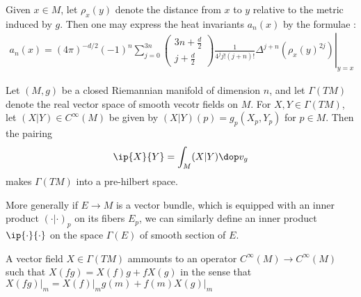 Given $x\in M$, let $\rho_x(y)$ denote the distance from $x$ to $y$ relative to the metric induced by $g$.  Then one may express the heat invariants $a_n(x)$ by the formulae \cite[Theorem 1.2.1]{polterovichHeatInvariantsRiemannian2000}:
\begin{align}
    a_n(x) = \left.(4 \pi)^{-d / 2}(-1)^n \sum_{j=0}^{3 n}\left(\begin{array}{c}
                                                                        3 n+\frac{d}{2} \\
                                                                        j+\frac{d}{2}
                                                                    \end{array}\right) \frac{1}{4^j j !(j+n) !} \Delta^{j+n}\left(\rho_x(y)^{2 j}\right)\right|_{y=x}
\end{align}


\newpage

Let $(M,g)$ be a closed Riemannian manifold of dimension $n$, and let $\Gamma(TM)$ denote the real vector space of smooth vecotr fields on $M$. For $X,Y \in \Gamma(TM)$, let $(X|Y) \in C^\infty(M)$ be given by $(X|Y)(p) = g_p(X_p,Y_p)$ for $p \in M$. Then the pairing
\begin{align*}
    \ip{X}{Y} = \int_M (X|Y) \dop v_g
\end{align*}
makes $\Gamma(TM)$ into a pre-hilbert space.

More generally if $E \to M$ is a vector bundle, which is equipped with an inner product $(\cdot | \cdot)_p$ on its fibers $E_p$, we can similarly define an inner product $\ip{\cdot}{\cdot}$ on the space $\Gamma(E)$ of smooth section of $E$.

\newpage
A vector field $X \in \Gamma(TM)$ ammounts to an operator $C^\infty(M) \to C^\infty(M)$ such that $X(fg)= X(f)g+fX(g)$ in the sense that $X(fg)\vert_m = X(f)\vert_m g(m) + f(m) X(g)\vert_m$